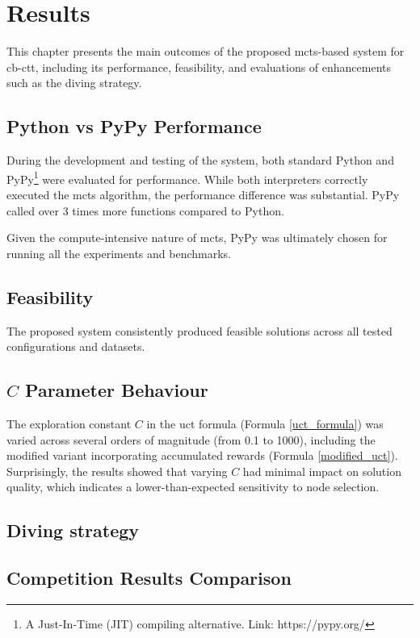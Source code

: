 \chapter{Results}

\label{Results}

This chapter presents the main outcomes of the proposed \ac{mcts}-based system for \ac{cb-ctt}, including its performance, feasibility, and evaluations of enhancements such as the diving strategy.

\section{Python vs PyPy Performance}

During the development and testing of the system, both standard Python and PyPy\footnote{A Just-In-Time (JIT) compiling alternative. Link: https://pypy.org/} were evaluated for performance. While both interpreters correctly executed the \ac{mcts} algorithm, the performance difference was substantial. PyPy called over 3 times more functions compared to Python.

Given the compute-intensive nature of \ac{mcts}, PyPy was ultimately chosen for running all the experiments and benchmarks.

\section{Feasibility}

The proposed system consistently produced feasible solutions across all tested configurations and datasets.

\section{\(C\) Parameter Behaviour}

The exploration constant \(C\) in the \ac{uct} formula (Formula \ref{uct_formula}) was varied across several orders of magnitude (from 0.1 to 1000), including the modified variant incorporating accumulated rewards (Formula \ref{modified_uct}). Surprisingly, the results showed that varying \(C\) had minimal impact on solution quality, which indicates a lower-than-expected sensitivity to node selection.

\section{Diving strategy}

\section{Competition Results Comparison}